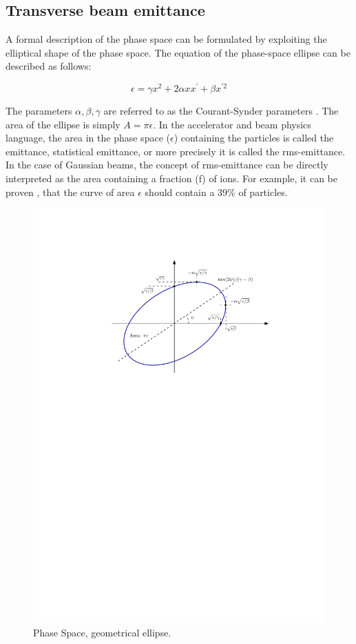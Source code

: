 \subsection{Transverse beam emittance}
\label{subsec:TransBeamEm}

A formal description of the phase space can be formulated by exploiting the elliptical shape of the phase space. The equation of the phase-space ellipse can be described as follows: 

\begin{equation}
    \epsilon = \gamma x^2 + 2\alpha x x^{'} + \beta x^{'2}
    \label{eq:ellipse}
\end{equation}

The parameters $\alpha, \beta, \gamma$ are referred to as the Courant-Synder parameters \parencite*[][]{ref:BookAccPhysics}. The area of the ellipse is simply $A = \pi \epsilon$. In the accelerator and beam physics language, the area in the phase space ($\epsilon$) containing the particles is called the emittance, statistical emittance, or more precisely it is called the rms-emittance. In the case of Gaussian beams, the concept of rms-emittance can be directly interpreted as the area containing a fraction (f) of ions. For example, it can be proven \parencite*[][]{ref:BookAccPhysics2},  that the curve of area $\epsilon$ should contain a $39\%$ of particles.

\begin{figure}[h]
    \centering
    \includegraphics[width=0.7\columnwidth]{Figure_GeometricEmittance/GeometricEmittancve.pdf}
    \caption{Phase Space, geometrical ellipse. }
    \label{fig:CouranSnyder}
\end{figure}

